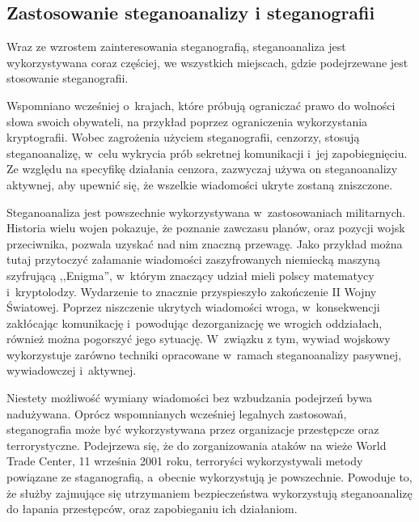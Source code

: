 \documentclass[a4paper, twoside, 12pt]{report}
\begin{document}
        \subsection{Zastosowanie steganoanalizy i steganografii}
        Wraz ze wzrostem zainteresowania steganografią, steganoanaliza jest wykorzystywana
        coraz częściej, we wszystkich miejscach, gdzie podejrzewane jest stosowanie
        steganografii.

        Wspomniano wcześniej o~krajach, które próbują ograniczać
        prawo do wolności słowa swoich obywateli, na przykład poprzez ograniczenia
        wykorzystania kryptografii. Wobec zagrożenia użyciem steganografii, cenzorzy,
        stosują steganoanalizę, w~celu wykrycia prób sekretnej komunikacji i~jej zapobiegnięciu.
        Ze względu na specyfikę działania cenzora, zazwyczaj używa on steganoanalizy
        aktywnej, aby upewnić się, że wszelkie wiadomości ukryte zostaną zniszczone.

        Steganoanaliza jest powszechnie wykorzystywana w~zastosowaniach militarnych.
        Historia wielu wojen pokazuje, że poznanie zawczasu planów, oraz pozycji
        wojsk przeciwnika, pozwala uzyskać nad nim znaczną przewagę. Jako przykład
        można tutaj przytoczyć załamanie wiadomości zaszyfrowanych niemiecką maszyną
        szyfrującą ,,Enigma'', w~którym znaczący udział mieli polscy matematycy i~kryptolodzy.
        Wydarzenie to znacznie przyspieszyło zakończenie II Wojny Światowej. Poprzez niszczenie ukrytych wiadomości wroga,
        w~konsekwencji zakłócając komunikację i~powodując dezorganizację we wrogich oddziałach,
        również można pogorszyć jego sytuację.
        W~związku z tym, wywiad wojskowy wykorzystuje zarówno techniki opracowane
        w~ramach steganoanalizy pasywnej, wywiadowczej i~aktywnej.

        Niestety możliwość wymiany wiadomości bez wzbudzania podejrzeń bywa nadużywana.
        Oprócz wspomnianych wcześniej legalnych zastosowań, steganografia może
        być wykorzystywana przez organizacje przestępcze oraz terrorystyczne. Podejrzewa
        się, że do zorganizowania ataków na wieże World Trade Center, 11 września 2001 roku,
        terroryści wykorzystywali metody powiązane ze staganografią, a~obecnie wykorzystują
        je powszechnie\cite{TERRORISMANDSTEGANOGRAPHY}.
        Powoduje to, że służby zajmujące się utrzymaniem bezpieczeństwa wykorzystują
        steganoanalizę do łapania przestępców, oraz zapobieganiu ich działaniom.
\end{document}
